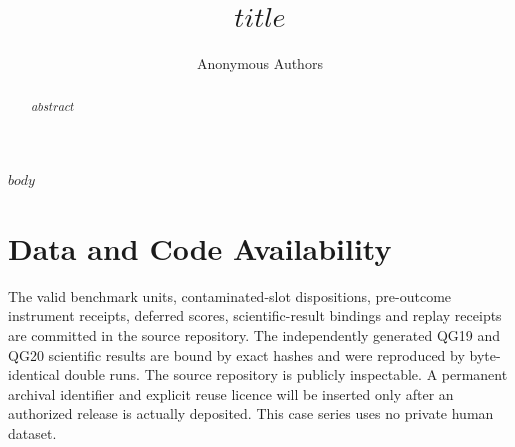 \documentclass[10pt]{article}
\title{$title$}
\author{Anonymous Authors}
\date{}
\begin{document}
\maketitle

\begin{abstract}
$abstract$
\end{abstract}

$body$

\section*{Data and Code Availability}
The valid benchmark units, contaminated-slot dispositions, pre-outcome instrument receipts,
deferred scores, scientific-result bindings and replay receipts are committed in the source
repository. The independently generated QG19 and QG20 scientific results are bound by exact
hashes and were reproduced by byte-identical double runs. The source repository is publicly
inspectable. A permanent archival identifier and explicit reuse licence will be inserted only
after an authorized release is actually deposited. This case series uses no private human dataset.



\end{document}
